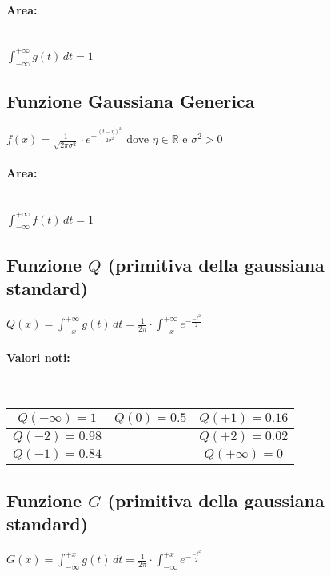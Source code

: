 \documentclass{article}
\begin{document}
\paragraph{Area:} ~\\
$\int_{-\infty}^{+\infty} g(t) \,dt = 1$

\subsection{Funzione Gaussiana Generica}
$f(x) = \frac{1}{\sqrt{2 \pi \sigma^2 }} \cdot e^{- \frac{(t - \eta)^2 }{2 \sigma^2}}$ dove $\eta \in \mathbb{R} $ e $\sigma^2 > 0$

\paragraph{Area:} ~\\
$\int_{-\infty}^{+\infty} f(t) \,dt = 1$

\subsection{Funzione $Q$ (primitiva della gaussiana standard)}
$Q(x) = \int_{-x}^{+\infty} g(t) \,dt = \frac{1}{2 \pi} \cdot \int_{-x}^{+\infty} e^{-\frac{-t^2}{2}}$

\paragraph{Valori noti:} ~\\

\begin{table} [h]
    \centering
    \begin{tabular}{|c|c|c|}
    \hline
        $Q(-\infty) = 1$ & $Q(0) = 0.5 $ & $Q(+1) = 0.16$\\
        \hline 
        $Q(-2) = 0.98$ &  & $Q(+2) = 0.02$\\
        \hline 
        $Q(-1) = 0.84$&  & $Q(+\infty) = 0$\\
    \hline
    \end{tabular}
\end{table}

\subsection{Funzione $G$ (primitiva della gaussiana standard)}
$G(x) = \int_{-\infty}^{+x} g(t) \,dt = \frac{1}{2 \pi} \cdot \int_{-\infty}^{+x} e^{-\frac{-t^2}{2}}$
\end{document}
